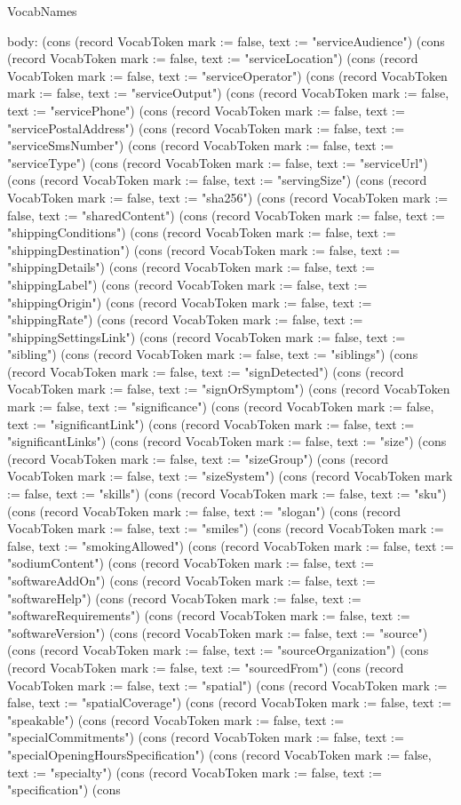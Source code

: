 \begin{lexlean}{VocabNames}
\begin{semanticmodule}
{  body: (cons (record VocabToken {mark := false, text := "serviceAudience"}) (cons (record VocabToken {mark := false, text := "serviceLocation"}) (cons (record VocabToken {mark := false, text := "serviceOperator"}) (cons (record VocabToken {mark := false, text := "serviceOutput"}) (cons (record VocabToken {mark := false, text := "servicePhone"}) (cons (record VocabToken {mark := false, text := "servicePostalAddress"}) (cons (record VocabToken {mark := false, text := "serviceSmsNumber"}) (cons (record VocabToken {mark := false, text := "serviceType"}) (cons (record VocabToken {mark := false, text := "serviceUrl"}) (cons (record VocabToken {mark := false, text := "servingSize"}) (cons (record VocabToken {mark := false, text := "sha256"}) (cons (record VocabToken {mark := false, text := "sharedContent"}) (cons (record VocabToken {mark := false, text := "shippingConditions"}) (cons (record VocabToken {mark := false, text := "shippingDestination"}) (cons (record VocabToken {mark := false, text := "shippingDetails"}) (cons (record VocabToken {mark := false, text := "shippingLabel"}) (cons (record VocabToken {mark := false, text := "shippingOrigin"}) (cons (record VocabToken {mark := false, text := "shippingRate"}) (cons (record VocabToken {mark := false, text := "shippingSettingsLink"}) (cons (record VocabToken {mark := false, text := "sibling"}) (cons (record VocabToken {mark := false, text := "siblings"}) (cons (record VocabToken {mark := false, text := "signDetected"}) (cons (record VocabToken {mark := false, text := "signOrSymptom"}) (cons (record VocabToken {mark := false, text := "significance"}) (cons (record VocabToken {mark := false, text := "significantLink"}) (cons (record VocabToken {mark := false, text := "significantLinks"}) (cons (record VocabToken {mark := false, text := "size"}) (cons (record VocabToken {mark := false, text := "sizeGroup"}) (cons (record VocabToken {mark := false, text := "sizeSystem"}) (cons (record VocabToken {mark := false, text := "skills"}) (cons (record VocabToken {mark := false, text := "sku"}) (cons (record VocabToken {mark := false, text := "slogan"}) (cons (record VocabToken {mark := false, text := "smiles"}) (cons (record VocabToken {mark := false, text := "smokingAllowed"}) (cons (record VocabToken {mark := false, text := "sodiumContent"}) (cons (record VocabToken {mark := false, text := "softwareAddOn"}) (cons (record VocabToken {mark := false, text := "softwareHelp"}) (cons (record VocabToken {mark := false, text := "softwareRequirements"}) (cons (record VocabToken {mark := false, text := "softwareVersion"}) (cons (record VocabToken {mark := false, text := "source"}) (cons (record VocabToken {mark := false, text := "sourceOrganization"}) (cons (record VocabToken {mark := false, text := "sourcedFrom"}) (cons (record VocabToken {mark := false, text := "spatial"}) (cons (record VocabToken {mark := false, text := "spatialCoverage"}) (cons (record VocabToken {mark := false, text := "speakable"}) (cons (record VocabToken {mark := false, text := "specialCommitments"}) (cons (record VocabToken {mark := false, text := "specialOpeningHoursSpecification"}) (cons (record VocabToken {mark := false, text := "specialty"}) (cons (record VocabToken {mark := false, text := "specification"}) (cons }
\end{semanticmodule}
\end{lexlean}
